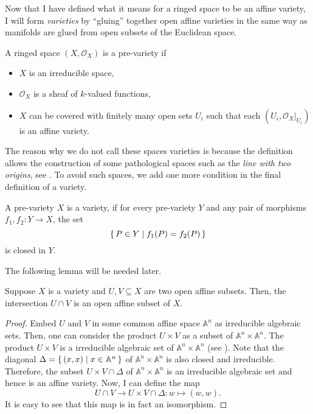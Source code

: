 Now that I have defined what it means for a ringed space to be an affine
variety, I will form \emph{varieties} by ``gluing'' together open affine varieties
in the same way as manifolds are glued from open subsets of the Euclidean
space.
\begin{defin}
  A ringed space $(X,\mathscr{O}_{X})$ is a pre-variety if
  \begin{itemize}
    \item $X$ is an irreducible space,
    \item $\mathscr{O}_{X}$ is a sheaf of $k$-valued functions,
    \item $X$ can be covered with finitely many open sets $U_{i}$
          such that each $(U_{i},\mathscr{O}_{X}\vert_{U_{i}})$ is
          an affine variety.
  \end{itemize}
\end{defin}
The reason why we do not call these spaces varieties
is because the definition allows the construction of some pathological
spaces such as the \emph{line with two origins}, see \cite{gathmann}.
To avoid such spaces, we add one more condition in the final definition
of a variety. %
\begin{defin}
  A pre-variety $X$ is a variety, if for every pre-variety $Y$ and any
  pair of morphisms $f_{1}, f_{2}: Y\to X$, the set
  \[\set{P\in Y\mid f_{1}(P)=f_{2}(P)}\]
  is closed in $Y$.
\end{defin}
The following lemma will be needed later.
\begin{lemm}\label{lemm:affine_intersection}
  Suppose $X$ is a variety and $U, V\subseteq X$ are two open affine subsets.
  Then, the intersection $U\cap V$ is an open affine subset of $X$.
\end{lemm}
\begin{proof}
  Embed $U$ and $V$ in some common affine space $\mathbb{A}^{n}$ as
  irreducible algebraic sets. Then, one can consider the product $U\times V$
  as a subset of $\mathbb{A}^{n}\times\mathbb{A}^{n}$. The product
  $U\times V$ is a irreducible algebraic set of
  $\mathbb{A}^{n}\times\mathbb{A}^{n}$ (see \cite{gathmann}). Note that the
  diagonal $\Delta =\set{(x,x)\mid x\in\mathbb{A}^{n}}$ of
  $\mathbb{A}^{n}\times\mathbb{A}^{n}$ is also closed and irreducible.
  Therefore, the subset $U\times V\cap\Delta$ of
  $\mathbb{A}^{n}\times\mathbb{A}^{n}$ is an irreducible algebraic set and
  hence is an affine variety. Now, I can define the map
  \[
    U\cap V\to U\times V\cap\Delta: w\mapsto (w,w).
  \]
  It is easy to see that this map is in fact an isomorphism.
\end{proof}

